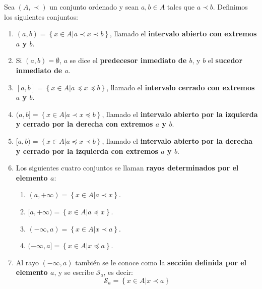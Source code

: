 \documentclass[12pt]{report}
\theoremstyle{largebreak}
\begin{document}
    \begin{mydef}
        Sea $(A,\prec)$ un conjunto ordenado y sean $a,b\in A$ tales que $a\prec b$. Definimos los siguientes conjuntos:
        \begin{enumerate}
            \item $(a,b)=\left\{x\in A\Big|a\prec x\prec b \right\}$, llamado el \textbf{intervalo abierto con extremos $a$ y $b$}.
            \item Si $(a,b)=\emptyset$, $a$ se dice el \textbf{predecesor inmediato de $b$}, y $b$ el \textbf{sucedor inmediato de $a$}.
            \item $[a,b]=\left\{x\in A\Big|a\preceq x\preceq b \right\}$, llamado el \textbf{intervalo cerrado con extremos $a$ y $b$}.
            \item $(a,b]=\left\{x\in A\Big|a\prec x\preceq b \right\}$, llamado el \textbf{intervalo abierto por la izquierda y cerrado por la derecha con extremos $a$ y $b$}.
            \item $[a,b)=\left\{x\in A\Big|a\preceq x\prec b \right\}$, llamado el \textbf{intervalo abierto por la derecha y cerrado por la izquierda con extremos $a$ y $b$}.
            \item Los siguientes cuatro conjuntos se llaman \textbf{rayos determinados por el elemento $a$}:
            \begin{enumerate}
                \item $(a,+\infty)=\left\{x\in A\Big|a\prec x \right\}$.
                \item $[a,+\infty)=\left\{x\in A\Big|a\preceq x \right\}$.
                \item $(-\infty,a)=\left\{x\in A\Big|x\prec a \right\}$.
                \item $(-\infty, a]=\left\{x\in A\Big|x\preceq a \right\}$.
            \end{enumerate}
            \item Al rayo $(-\infty, a)$ también se le conoce como la \textbf{sección definida por el elemento $a$}, y se escribe $\mathcal{S}_a$, es decir:
            \begin{equation*}
                \mathcal{S}_a=\left\{x\in A\Big|x\prec a \right\}
            \end{equation*}
        \end{enumerate}
    \end{mydef}
\end{document}
